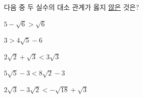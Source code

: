 다음 중 두 실수의 대소 관계가 옳지 \underline{않은} 것은?
\begin{choicesv}{\rule[-3ex]{0pt}{8ex}$5-\sqrt{6}>\sqrt{6}$}{\rule[-3ex]{0pt}{8ex}$3>4\sqrt{5}-6$}{\rule[-3ex]{0pt}{8ex}$2\sqrt{2}+\sqrt{3}<3\sqrt{3}$}{\rule[-3ex]{0pt}{8ex}$5\sqrt{5}-3<8\sqrt{2}-3$}{\rule[-3ex]{0pt}{8ex}$2\sqrt{3}-3\sqrt{2}<-\sqrt{18}+\sqrt{3}$}\end{choicesv}
